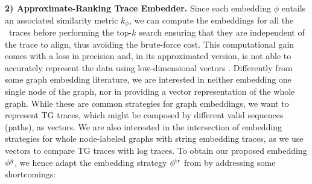 {{	
\noindent
\textbf{2) Approximate-Ranking Trace Embedder.}\label{subsec:ate}
Since each embedding $\phi$ entails an associated similarity metric $k_\phi$, %
we can compute the embeddings for all the \unravelled\ traces
before performing the top-$k$ search ensuring that they are independent of the trace to align, thus avoiding the brute-force cost. This computational gain comes with a loss in precision %
 \cite{GartnerFW03} and, in its approximated version, is not able to accurately represent the data using low-dimensional vectors \cite{Seshadhri5631}. %
Differently from some graph embedding literature, we are interested in neither embedding one single node of the graph, nor in providing a vector representation of the whole graph. While these are common strategies for graph embeddings, we want to represent TG traces,  which might be composed by different valid sequences (paths), as vectors.  We are also interested in the intersection of embedding strategies for whole node-labeled graphs with string embedding traces, as we use vectors to compare TG traces with log traces. 
{To obtain our proposed embedding ${\phi^{g}}$, we hence adapt the  embedding strategy} ${\phi^{\text{tr}}}$ from \cite{LodhiSSCW02} {by addressing some short\-comings: %
}}}
